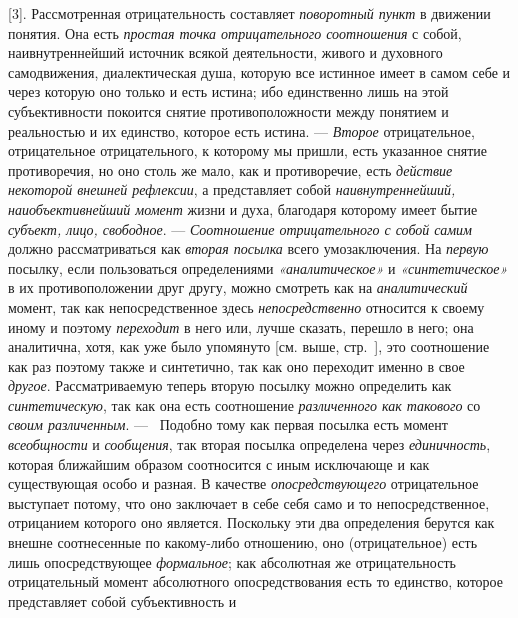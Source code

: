 \documentclass[twoside]{article}
\begin{document}
[3]. Рассмотренная отрицательность составляет
{\em поворотный пункт} в
движении понятия. Она есть {\em простая
точка отрицательного соотношения} с собой, наивнутреннейший
источник всякой деятельности, живого и духовного самодвижения,
диалектическая душа, которую все истинное имеет в самом себе и через
которую оно только и есть истина; ибо единственно лишь на этой
субъективности покоится снятие противоположности между понятием и
реальностью и их единство, которое есть истина. —
{\em Второе}
отрицательное, отрицательное отрицательного, к которому мы
пришли, есть указанное снятие противоречия, но оно столь же мало, как и
противоречие, есть {\em действие
некоторой внешней рефлексии}, а представляет собой
{\em наивнутреннейший, наиобъективнейший
момент} жизни и духа, благодаря которому имеет бытие
{\em субъект, лицо, свободное}. —
{\em Соотношение отрицательного с собой
самим} должно рассматриваться как
{\em вторая посылка}
всего умозаключения. На
{\em первую} посылку,
если пользоваться определениями
{\em «аналитическое»} и
{\em «синтетическое»} в
их противоположении друг другу, можно смотреть как на
{\em аналитический}
момент, так как непосредственное здесь
{\em непосредственно}
относится к своему иному и поэтому
{\em переходит} в него
или, лучше сказать, перешло в него; она аналитична, хотя, как уже было
упомянуто [см. выше, стр.~\pageref{bkm:bmpg224a}], это
соотношение как раз поэтому также и синтетично, так как оно переходит
именно в свое {\em другое}.
Рассматриваемую теперь вторую посылку можно определить как
{\em синтетическую}, так
как она есть соотношение
{\em различенного как такового}
со {\em своим
различенным}. — ~Подобно тому как первая посылка есть момент
{\em всеобщности} и
{\em сообщения}, так
вторая посылка определена через
{\em единичность},
которая ближайшим образом соотносится с иным исключающе и
как существующая особо и разная. В качестве
{\em опосредствующего}
отрицательное выступает потому, что оно заключает в себе себя
само и то непосредственное, отрицанием которого оно
является. Поскольку эти два определения берутся как внешне соотнесенные по
какому-либо отношению, оно (отрицательное) есть лишь опосредствующее
{\em формальное}; как
абсолютная же отрицательность отрицательный момент абсолютного
опосредствования есть то единство, которое представляет собой
субъективность и
\end{document}
